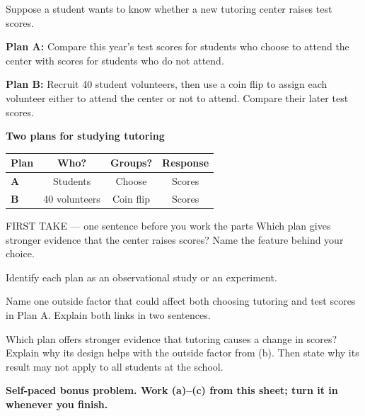 \documentclass[14pt]{extarticle}
\begin{document}
\pagestyle{empty}


\noindent\begin{minipage}[t]{0.57\linewidth}
\vspace{0pt}
Suppose a student wants to know whether a new tutoring center raises test scores.\par\smallskip \textbf{Plan A:} Compare this year's test scores for students who choose to attend the center with scores for students who do not attend.\par \textbf{Plan B:} Recruit 40 student volunteers, then use a coin flip to assign each volunteer either to attend the center or not to attend. Compare their later test scores.\par
\end{minipage}\hfill
\begin{minipage}[t]{0.40\linewidth}
\vspace{0pt}
\begin{center}
\textbf{Two plans for studying tutoring}\par\smallskip
\begin{tabular}{|l|c|c|c|}
\hline
\textbf{Plan} & \textbf{Who?} & \textbf{Groups?} & \textbf{Response} \\ \hline
\textbf{A} & Students & Choose & Scores \\ \hline
\textbf{B} & 40 volunteers & Coin flip & Scores \\ \hline
\end{tabular}
\end{center}
\end{minipage}

\begin{firsttakebox}{FIRST TAKE --- one sentence before you work the parts}
Which plan gives stronger evidence that the center raises scores? Name the feature behind your choice.
\end{firsttakebox}

\begin{description}[leftmargin=1.15in, labelwidth=1in, itemsep=2pt, topsep=2pt]
  \item[\dokbadge{1}~(a)] Identify each plan as an observational study or an experiment.
  \item[\dokbadge{2}~(b)] Name one outside factor that could affect both choosing tutoring and test scores in Plan A. Explain both links in two sentences.
  \item[\dokbadge{3}~(c)] Which plan offers stronger evidence that tutoring causes a change in scores? Explain why its design helps with the outside factor from (b). Then state why its result may not apply to all students at the school.
\end{description}

\vfill
\textbf{Self-paced bonus problem. Work (a)--(c) from this sheet; turn it in whenever you finish.}
\end{document}
